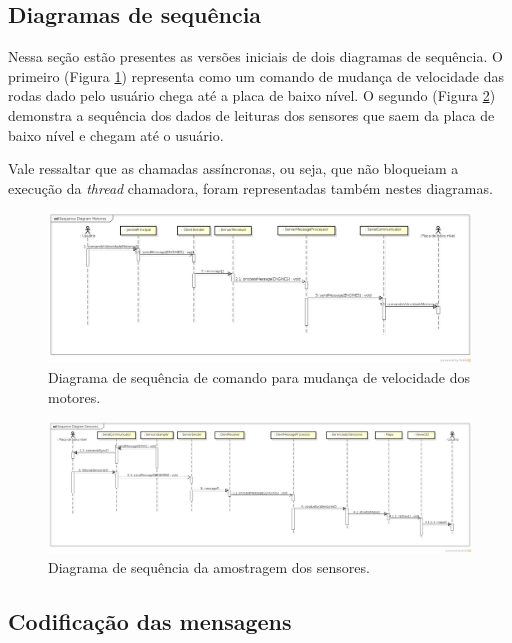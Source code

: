 \subsection{Diagramas de sequência}

Nessa seção estão presentes as versões iniciais de dois diagramas de sequência. O primeiro (Figura \ref{fig:diagrama_sequencia_motores}) representa como um comando de mudança de velocidade das rodas dado pelo usuário chega até a placa de baixo nível. O segundo (Figura \ref{fig:diagrama_sequencia_sensores}) demonstra a sequência dos dados de leituras dos sensores que saem da placa de baixo nível e chegam até o usuário. 

Vale ressaltar que as chamadas assíncronas, ou seja, que não bloqueiam a execução da \textit{thread} chamadora, foram representadas também nestes diagramas.

\begin{figure}[H]
  \centering
  \includegraphics[width=\textwidth, keepaspectratio]{./figuras/diagrama_sequencia_motores.png}
  \caption{Diagrama de sequência de comando para mudança de velocidade dos motores.}
  \label{fig:diagrama_sequencia_motores}
\end{figure}

\begin{figure}[H]
  \centering
  \includegraphics[width=\textwidth, keepaspectratio]{./figuras/diagrama_sequencia_sensores.png}
  \caption{Diagrama de sequência da amostragem dos sensores.}
  \label{fig:diagrama_sequencia_sensores}
\end{figure}


\subsection{Codificação das mensagens}
\label{sec:codificacao_mensagens}

